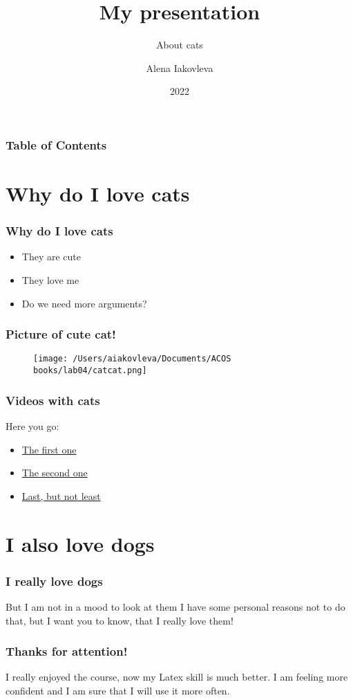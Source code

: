 \documentclass{beamer}
\title[] 
{My presentation}
\subtitle{About cats}
\author{Alena Iakovleva}}
\institute{ 
  Faculty of Computer Science \\
  HSE University
}
\date{2022}
\begin{document}
\frame{\titlepage}

\begin{frame}
\frametitle{Table of Contents}
\tableofcontents
\end{frame}

\section{Why do I love cats}

\begin{frame}
\frametitle{Why do I love cats}

\begin{itemize}
    \item They are cute
    \item They love me
    \item Do we need more arguments?
\end{itemize}
\end{frame}

\begin{frame}
\frametitle{Picture of cute cat!} 
\begin{figure}[h]
\centering
\texttt{[image: /Users/aiakovleva/Documents/ACOS\\ books/lab04/catcat.png]}
\end{figure}

\end{frame}

\begin{frame}
\frametitle{Videos with cats} 

Here you go:
\begin{itemize}
    \item \href{https://www.youtube.com/watch?v=AoTvVf8Z_I8/}{The first one} 
    \item \href{https://www.youtube.com/watch?v=-452p_9ESbM}{The second one} 
    \item \href{https://www.youtube.com/watch?v=sn-S82mF_gw}{Last, but not least} 
\end{itemize}


\end{frame}


\section{I also love dogs}

\begin{frame}
\frametitle{I really love dogs}

\begin{block}{But I am not in a mood to look at them}
I have some personal reasons not to do that, but I want you to know, that I really love them!
\end{block}

\end{frame}


\begin{frame}
\frametitle{Thanks for attention!}

I really enjoyed the course, now my Latex skill is much better. I am feeling more confident and I am sure that I will use it more often.

\end{frame}
\end{document}
